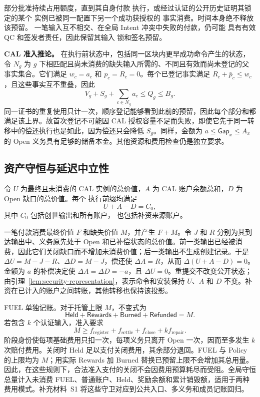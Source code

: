 部分批准持续占用额度，直到其自身付款
执行，或经过认证的公开历史证明其锁定的某个
实例已被同一配置下另一个成功获授权的
事实消费。时间本身绝不释放该预留。
一笔输入互不相交、在全局 Intent 冲突中失败的付款，仍可能
具有有效 QC 和签发者责任，因此保留其输入
锁和签名预留。

\noindent\textbf{CAL 准入推论。}
在执行前状态中，包括同一区块内更早成功命令产生的状态，令 $N_g$ 为 $g$ 下相匹配且尚未消费的缺失输入所需的、不同且有效而尚未登记的父事实集合。它们满足 $w_c=a_c$ 和 $p_c=R_c=0$。每个已登记事实满足 $R_c+\bar p_c\le w_c$，且这些事实互不重叠，因此
\begin{equation}
 V_g+S_g+\sum_{c\in N_g}a_c\le Q_g\le B_g.
 \label{eq:security-admission}
\end{equation}
同一证书的重复使用只计一次，顺序登记能够看到此前的预留，因此每个部分和都满足该上界。故首次登记不可能因 CAL 授权容量不足而失败，即使它先于同一转移中的偿还执行也是如此，因为偿还只会降低 $S_g$。同样，金额为 $a\le\mathsf{Gap}_x\le A_x$ 的 Open 义务具有足够的储备本金。其他资源和费用检查仍是独立要求。

\subsection{资产守恒与延迟中立性}
\label{sec:security-conservation}

\begin{theorem}[CAL 守恒]
\label{thm:security-conservation}
令 $U$ 为最终且未消费的 CAL 实例的总价值，$A$ 为
CAL 账户余额总和，$D$ 为 Open 缺口的总价值。每个
执行前缀均满足
\begin{equation}
 U+A-D=C_0,
 \label{eq:security-conservation}
\end{equation}
其中 $C_0$ 包括创世输出和所有账户，
也包括补资来源账户。
\end{theorem}
\begin{IEEEproof}
一笔付款消费最终价值 $F$ 和缺失价值 $M$，并产生 $F+M$。令 $J$ 和 $R$ 分别为其到达输出中、义务原先处于 Open 和已补偿状态的总价值。前一类输出已经被消费，因此它们关闭缺口而不增加未消费价值；后一类输出不生成创建记录。于是 $\Delta U=M-J-R$、$\Delta D=M-J$，偿还使 $\Delta A=R$，从而 $\Delta(U+A-D)=0$。金额为 $a$ 的补偿决定使 $\Delta A=\Delta D=-a$，且 $\Delta U=0$。重提交不改变公开状态；由引理~\ref{lem:security-representation}，表示命令和安装保持 $U$、$A$ 和 $D$ 不变。补资在已计入的账户之间转账，其他转移也保持该投影。
\end{IEEEproof}

FUEL 单独记账。对于托管上限 $M$，不变式为
\[
 \mathsf{Held}+\mathsf{Rewards}+\mathsf{Burned}+\mathsf{Refunded}=M.
\]
若包含 $k$ 个认证输入，准入要求
\[
 M\ge f_{\mathrm{register}}+f_{\mathrm{settle}}+f_{\mathrm{close}}
       +k f_{\mathrm{repair}}.
\]
阶段身份使每项基础费用只扣一次，每项义务只离开 Open 一次，因而至多发生 $k$ 次赔付费用。关闭时 Held 足以支付关闭费用，其余部分退回。FUEL 与 Policy 的上限均为 $M$；用实际 Rewards 加 Burned 替换已预留上限不会增加其总用量。因此，在这些规则下，合法准入支付的关闭不会因费用预算耗尽而受阻。全局守恒总量计入未消费 FUEL、普通账户、Held、奖励余额和累计销毁额，适用于两种费用模式。补充材料~S1 将这些守卫对应到公共入口、多义务和成员记账回归。

